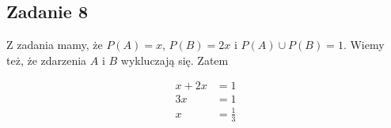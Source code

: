 \subsection{Zadanie 8}

Z zadania mamy, że $P(A) = x$, $P(B) = 2x$ i $P(A) \cup P(B) = 1$.
Wiemy też, że zdarzenia $A$ i $B$ wykluczają się. Zatem

\begin{align*}
x + 2x &= 1 \\
3x &= 1 \\
x &= \frac{1}{3}
\end{align*}

